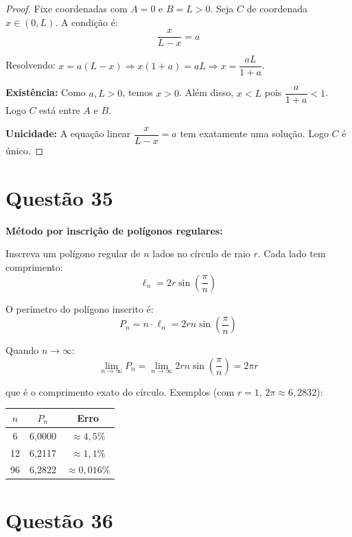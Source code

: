 \documentclass[12pt,a4paper]{article}
\begin{document}
\begin{proof}
Fixe coordenadas com $A = 0$ e $B = L > 0$. Seja $C$ de coordenada $x \in (0, L)$. A condi\c{c}\~ao \'e:
$$\frac{x}{L - x} = a$$

Resolvendo: $x = a(L - x) \Rightarrow x(1+a) = aL \Rightarrow x = \dfrac{aL}{1+a}$.

\textbf{Exist\^encia:} Como $a, L > 0$, temos $x > 0$. Al\'em disso, $x < L$ pois $\dfrac{a}{1+a} < 1$. Logo $C$ est\'a entre $A$ e $B$.

\textbf{Unicidade:} A equa\c{c}\~ao linear $\dfrac{x}{L-x} = a$ tem exatamente uma solu\c{c}\~ao. Logo $C$ \'e \'unico.
\end{proof}

\section*{Quest\~ao 35}

\textbf{M\'etodo por inscri\c{c}\~ao de pol\'igonos regulares:}

Inscreva um pol\'igono regular de $n$ lados no c\'irculo de raio $r$. Cada lado tem comprimento:
$$\ell_n = 2r\sin\!\left(\frac{\pi}{n}\right)$$

O per\'imetro do pol\'igono inscrito \'e:
$$P_n = n \cdot \ell_n = 2rn\sin\!\left(\frac{\pi}{n}\right)$$

Quando $n \to \infty$:
$$\lim_{n \to \infty} P_n = \lim_{n \to \infty} 2rn\sin\!\left(\frac{\pi}{n}\right) = 2\pi r$$

que \'e o comprimento exato do c\'irculo. Exemplos (com $r = 1$, $2\pi \approx 6{,}2832$):

\begin{center}
\begin{tabular}{ccc}
\toprule
$n$ & $P_n$ & Erro \\
\midrule
6 & 6,0000 & $\approx 4{,}5\%$ \\
12 & 6,2117 & $\approx 1{,}1\%$ \\
96 & 6,2822 & $\approx 0{,}016\%$ \\
\bottomrule
\end{tabular}
\end{center}

\section*{Quest\~ao 36}
\end{document}

